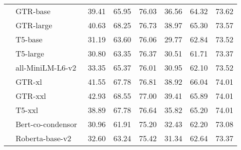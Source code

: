 \begin{table}[!ht]
{\begin{tabular}{@{}l |l| c c c  | c c c@{}}
\midrule

& GTR-base~\cite{ni2021large} & 39.41 &65.95 & 76.03  & 36.56 &64.32 &73.62  \\
& GTR-large & 40.63 &68.25 & 76.73  & 38.97 &65.30 &73.57 \\
& T5-base~\cite{raffel2020exploring} & 31.19 &63.60 & 76.06  & 29.77 &62.84 &73.52 \\
& T5-large & 30.80 &63.35 &76.37   & 30.51  &61.71 &73.37 \\
&   all-MiniLM-L6-v2~\cite{wang2020minilmv2} & 33.35  & 65.37  &  76.01 & 30.95   & 62.10  & 73.52 \\
& GTR-xl   & 41.55  & 67.78  & 76.81 &  38.92   &  66.04  & 74.01 \\
& GTR-xxl   & 42.93 &  68.55&  77.00 &39.41    & 65.89 & 74.01 \\
&  T5-xxl  & 38.89  &  67.78  &76.64   &  35.82  & 65.20  & 74.01 \\
&  Bert-co-condensor  & 30.96  & 61.91   &  75.20 &  32.43  &  62.20  & 73.08 \\
&  Roberta-base-v2  & 32.60  & 63.24  & 75.42  &  31.34  &  62.64 &  73.37 \\

\bottomrule           
\end{tabular}}

\label{tab:reranking-result}
\end{table}


